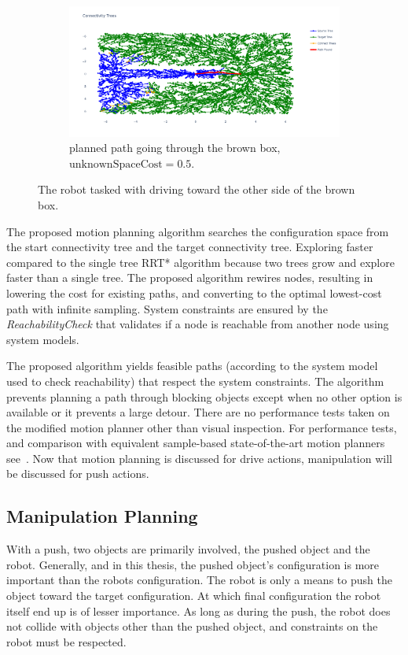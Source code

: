 \begin{figure}[H]
    \begin{subfigure}{1.11\textwidth}
    \centering
    \includegraphics[width=\textwidth]{figures/required_background/mp/mp_low_fixed_cost}
    \caption{planned path going through the brown box, $\textrm{unknownSpaceCost} = 0.5$.}
    \end{subfigure}
    \caption{The robot tasked with driving toward the other side of the brown box.}%
    \label{fig:mp_push_or_drive}
\end{figure}

The proposed motion planning algorithm searches the configuration space from the start connectivity tree and the target connectivity tree. Exploring faster compared to the single tree \ac{RRT*} algorithm because two trees grow and explore faster than a single tree. The proposed algorithm rewires nodes, resulting in lowering the cost for existing paths, and converting to the optimal lowest-cost path with infinite sampling. System constraints are ensured by the \textit{ReachabilityCheck} that validates if a node is reachable from another node using system models.\bs

The proposed algorithm yields feasible paths (according to the system model used to check reachability) that respect the system constraints. The algorithm prevents planning a path through blocking objects except when no other option is available or it prevents a large detour. There are no performance tests taken on the modified motion planner other than visual inspection. For performance tests, and comparison with equivalent sample-based state-of-the-art motion planners see~\cite{chen_fast_2018}. Now that motion planning is discussed for drive actions, manipulation will be discussed for push actions.


\subsection{Manipulation Planning}%
\label{subsec:manipulation_planning}
With a push, two objects are primarily involved, the pushed object and the robot. Generally, and in this thesis, the pushed object's configuration is more important than the robots configuration. The robot is only a means to push the object toward the target configuration. At which final configuration the robot itself end up is of lesser importance. As long as during the push, the robot does not collide with objects other than the pushed object, and constraints on the robot must be respected.\bs

